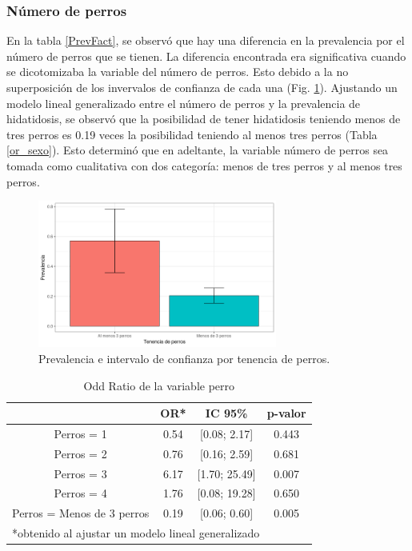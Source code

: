\newpage

\subsubsection{Número de perros}
En la tabla \ref{PrevFact}, se observó que hay una diferencia en la prevalencia por el número de perros que se tienen. La diferencia encontrada era significativa cuando se dicotomizaba la variable del número de perros. Esto debido a la no superposición de los invervalos de confianza de cada una (Fig. \ref{fig:bar_perrosprevalencia}). Ajustando un modelo lineal generalizado entre el número de perros y la prevalencia de hidatidosis, se observó que la posibilidad de tener hidatidosis teniendo menos de tres perros es 0.19 veces la posibilidad teniendo al menos tres perros (Tabla \ref{or_sexo}). Esto determinó que en adeltante, la variable número de perros sea tomada como cualitativa con dos categoría: menos de tres perros y al menos tres perros.

\begin{figure}[h]
	\centering
	\includegraphics[width=0.7\textwidth]{graficos/perrosprevalencia.png}
	\caption{Prevalencia e intervalo de confianza por tenencia de perros.}
	\label{fig:bar_perrosprevalencia}
\end{figure}

\begin{table}[h]
	\centering
	\caption{Odd Ratio de la variable perro}
	\label{or_perros}
	\begin{tabular}{cccc}
		\hline
		\multicolumn{1}{l}{}          & OR*     & IC 95\%              & p-valor   \\ \hline
		Perros = 1                    & 0.54    & [0.08; 2.17]     & 0.443     \\
		Perros = 2                    & 0.76    & [0.16; 2.59]     & 0.681     \\
		Perros = 3                    & 6.17    & [1.70; 25.49]    & 0.007     \\
		Perros = 4                    & 1.76    & [0.08; 19.28]    & 0.650     \\ \hline
		Perros = Menos de 3 perros    & 0.19    & [0.06; 0.60]     & 0.005     \\ \hline
		\multicolumn{4}{l}{*obtenido al ajustar un modelo lineal generalizado}
	\end{tabular}
\end{table}

